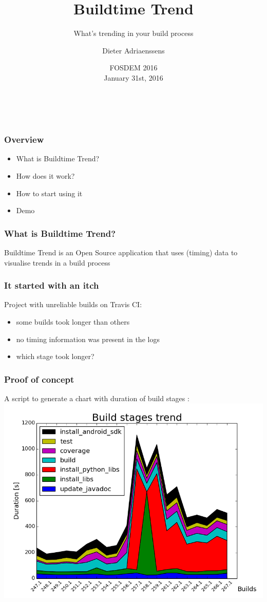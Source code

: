 \documentclass[14pt]{beamer}
\title[Buildtime Trend]{Buildtime Trend}
\subtitle{What's trending in your build process}
\author{Dieter Adriaenssens}
\institute[]{Buildtime Trend founder \& developer - @dcadriaenssens}
\date[FOSDEM 2016]{FOSDEM 2016\\
January 31st, 2016}
\begin{document}
  \begin{frame}
    \titlepage
    \vfill
    \begin{center}
      \\[2.5ex]
        {\tiny\CcNote{\CcLongnameByNcSa}}
        \vspace*{-2.5ex}
    \end{center}
  \end{frame}
  \begin{frame}
    \frametitle{Overview}
    \begin{itemize}
      \item What is Buildtime Trend?
      \item How does it work?
      \item How to start using it
      \item Demo
    \end{itemize}
  \end{frame}
  \begin{frame}
    \frametitle{What is Buildtime Trend?}
    Buildtime Trend is an Open Source application that uses (timing) data to visualise trends in a build process
  \end{frame}
  \begin{frame}
    \frametitle{It started with an itch}
    Project with unreliable builds on Travis CI:
    \begin{itemize}
      \item some builds took longer than others
      \item no timing information was present in the logs
      \item which stage took longer?
    \end{itemize}
  \end{frame}
  \begin{frame}
    \frametitle{Proof of concept}
    A script to generate a chart with duration of build stages :
    \includegraphics[scale=.45]{example_matplotlib_trend.png}
  \end{frame}
\end{document}
